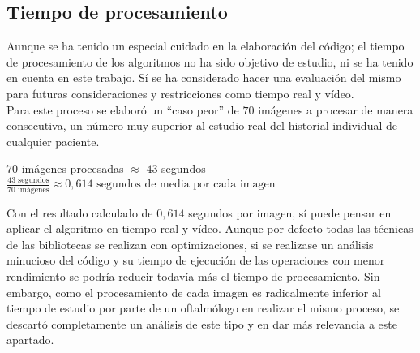 \subsection{Tiempo de procesamiento}
Aunque se ha tenido un especial cuidado en la elaboración del código;
el tiempo de procesamiento de los algoritmos no ha sido objetivo de
estudio, ni se ha tenido en cuenta en este trabajo. Sí se ha
considerado hacer una evaluación del mismo para futuras
consideraciones y restricciones como tiempo
real y vídeo.\\
Para este proceso se elaboró un ``caso peor'' de $70$ imágenes a
procesar de manera consecutiva, un número muy superior al estudio real
del historial individual de cualquier paciente.\\
\begin{center}
  $70$ imágenes procesadas $\approx$ $43$ segundos
  \\[0.5cm]
  $\frac{43 \text{ segundos}}{70 \text{ imágenes}} \approx 0,614
  \text{ segundos de media por cada imagen}$
\end{center}
Con el resultado calculado de $0,614$ segundos por imagen, sí puede
pensar en aplicar el algoritmo en tiempo real y vídeo. Aunque por
defecto todas las técnicas de las bibliotecas se realizan con
optimizaciones, si se realizase un análisis minucioso del código y su
tiempo de ejecución de las operaciones con menor rendimiento se podría
reducir todavía más el tiempo de procesamiento. Sin embargo, como el
procesamiento de cada imagen es radicalmente inferior al tiempo de
estudio por parte de un oftalmólogo en realizar el mismo proceso, se
descartó completamente un análisis de este tipo y en dar más
relevancia a este apartado.